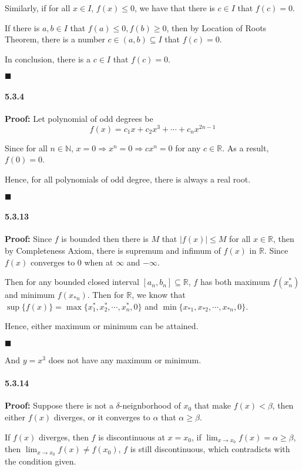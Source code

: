 \documentclass[11pt]{article}
\newcommand{\qed}{
	\begin{flushright}
		$\blacksquare$
	\end{flushright}}
\begin{document}
	Similarly, if for all $x \in I$, $f(x) \leq 0$, we have that there is $c \in I$ that $f(c) = 0$.
	
	If there is $a, b \in I$ that $f(a) \leq 0, f(b) \geq 0$, then by Location of Roots Theorem, there is a number $c \in (a, b) \subseteq I$ that $f(c) = 0$.
	
	In conclusion, there is a $c \in I$ that $f(c) = 0$.
	\qed
	\paragraph{5.3.4}\textbf{Proof:}
		Let polynomial of odd degrees be 
			\[f(x) = c_1x + c_2x^3 + \cdots + c_nx^{2n - 1}\]
			
		Since for all $n \in \mathbb{N}$, $x = 0 \Rightarrow x^n = 0 \Rightarrow cx^n = 0$ for any $c \in \mathbb{R}$. As a result, $f(0) = 0$.
		
		Hence, for all polynomials of odd degree, there is always a real root.
		\qed
	\paragraph{5.3.13}\textbf{Proof:}
		Since $f$ is bounded then there is $M$ that $|f(x)| \leq M$ for all $x \in \mathbb{R}$, then by Completeness Axiom, there is supremum and infimum of $f(x)$ in $\mathbb{R}$. Since $f(x)$ converges to $0$ when at $\infty$ and $-\infty$. 
		
		Then for any bounded closed interval $[a_n, b_n] \subseteq \mathbb{R}$, $f$ has both maximum $f(x^*_n)$ and minimum $f(x_{*n})$. Then for $\mathbb{R}$, we know that $\sup \{f(x)\} = \max \{x^*_1, x^*_2, \cdots, x^*_n, 0\}$ and $\min \{x_{*1}, x_{*2}, \cdots, x_{*n}, 0\}$. 
		
		Hence, either maximum or minimum can be attained.
		\qed
		
		And $y = x^3$ does not have any maximum or minimum.
	\paragraph{5.3.14}\textbf{Proof:}
		Suppose there is not a $\delta$-neignborhood of $x_0$ that make $f(x) < \beta$, then either $f(x)$ diverges, or it converges to $\alpha$ that $\alpha \geq \beta$.
		
		If $f(x)$ diverges, then $f$ is discontinuous at $x = x_0$, if $\lim_{x \rightarrow x_0} f(x) = \alpha \geq \beta$, then $\lim_{x \rightarrow x_0} f(x) \neq f(x_0)$, $f$ is still discontinuous, which contradicts with the condition given.
		
\end{document}

